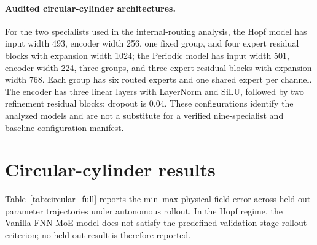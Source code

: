 \documentclass{article}
\providecommand{\DIFaddtex}[1]{{\protect\color{blue} \sf #1}} %
\providecommand{\DIFaddend}{} %
\providecommand{\DIFadd}[1]{\texorpdfstring{\DIFaddtex{#1}}{#1}} %
\DeclareRobustCommand{\DIFaddend}{\DIFOaddend \let\includegraphics\DIFOincludegraphics} %
\begin{document}
\paragraph{\DIFadd{Audited circular-cylinder architectures.}}
\DIFadd{For the two specialists used in the internal-routing analysis, the Hopf model has input width 493, encoder width 256, one fixed group, and four expert residual blocks with expansion width 1024; the Periodic model has input width 501, encoder width 224, three groups, and three expert residual blocks with expansion width 768. Each group has six routed experts and one shared expert per channel. The encoder has three linear layers with LayerNorm and SiLU, followed by two refinement residual blocks; dropout is 0.04. These configurations identify the analyzed models and are not a substitute for a verified nine-specialist and baseline configuration manifest.
}

\DIFaddend \section{Circular-cylinder results}
\label{app:circular}

Table~\ref{tab:circular_full} reports the min--max physical-field error across held-out parameter trajectories under autonomous rollout. In the Hopf regime, the Vanilla-FNN-MoE model does not satisfy the predefined validation-stage rollout criterion; no held-out result is therefore reported.
\end{document}

